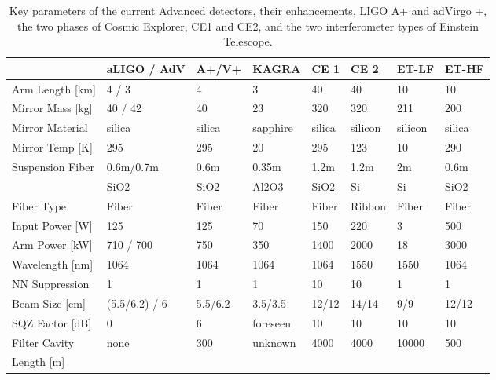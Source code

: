 \begin{table}[h]
\centering
\begin{tabular}{|l|l|l|p{1.6cm}|l|l|l|l|}
\hline
 &aLIGO / AdV &A+/V+ &KAGRA &CE 1 &CE 2 &ET-LF &ET-HF\\
\hline
Arm Length [km] & 4 / 3 &4& 3& 40& 40& 10 &10\\
\hline
Mirror Mass [kg]& 40 / 42& 40& 23& 320& 320& 211& 200\\
\hline
Mirror Material& silica& silica& sapphire& silica& silicon& silicon& silica\\
\hline
Mirror Temp [K]& 295& 295& 20& 295& 123& 10& 290\\
\hline
Suspension Fiber& 0.6m/0.7m& 0.6m& 0.35m& 1.2m& 1.2m& 2m& 0.6m\\
& SiO2& SiO2&Al2O3&SiO2&Si&Si&SiO2\\
\hline
Fiber Type& Fiber& Fiber& Fiber& Fiber& Ribbon& Fiber& Fiber\\
\hline
Input Power [W]& 125& 125& 70& 150& 220& 3& 500\\
\hline
Arm Power [kW]& 710 / 700& 750& 350& 1400& 2000& 18& 3000\\
\hline
Wavelength [nm]& 1064& 1064& 1064& 1064& 1550& 1550& 1064\\
\hline
NN Suppression& 1& 1& 1& 10& 10& 1& 1\\
\hline
Beam Size [cm]& (5.5/6.2) / 6& 5.5/6.2& 3.5/3.5& 12/12& 14/14& 9/9& 12/12\\
\hline
SQZ Factor [dB]& 0& 6& foreseen& 10& 10& 10& 10\\
\hline
Filter Cavity & none& 300& unknown& 4000& 4000& 10000& 500\\
Length [m] &&&&&&&\\
\hline
\end{tabular}
\caption{Key parameters of the current Advanced detectors, their enhancements, LIGO A+ and adVirgo +, the two phases of Cosmic Explorer, CE1 and CE2, and the two interferometer types of Einstein Telescope.}
\label{Tab:FutIfos}
\end{table}
